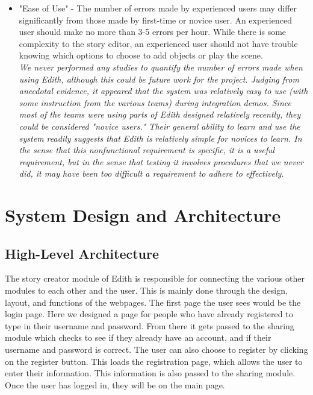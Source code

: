 \documentclass[12pt]{article}
\begin{document}
\begin{itemize}

\item "Ease of Use" - The number of errors made by experienced users may differ significantly from those made by first-time or novice user. An experienced user should make no more than 3-5 errors per hour. While there is some complexity to the story editor, an experienced user should not have trouble knowing which options to choose to add objects or play the scene. \\

\textit{We never performed any studies to quantify the number of errors made when using Edith, although this could be future work for the project. Judging from anecdotal evidence, it appeared that the system was relatively easy to use (with some instruction from the various teams) during integration demos. Since most of the teams were using parts of Edith designed relatively recently, they could be considered "novice users." Their general ability to learn and use the system readily suggests that Edith is relatively simple for novices to learn. In the sense that this nonfunctional requirement is specific, it is a useful requirement, but in the sense that testing it involves procedures that we never did, it may have been too difficult a requirement to adhere to effectively.}

\end{itemize}
\section{System Design and Architecture}

\subsection{High-Level Architecture}
The story creator module of Edith is responsible for connecting the various other modules to each other and the user. This is mainly done through the design, layout, and functions of the webpages. The first page the user sees would be the login page. Here we designed a page for people who have already registered to type in their username and password. From there it gets passed to the sharing module which checks to see if they already have an account, and if their username and password is correct. The user can also choose to register by clicking on the register button. This loads the registration page, which allows the user to enter their information. This information is also passed to the sharing module. Once the user has logged in, they will be on the main page. \\
\end{document}

